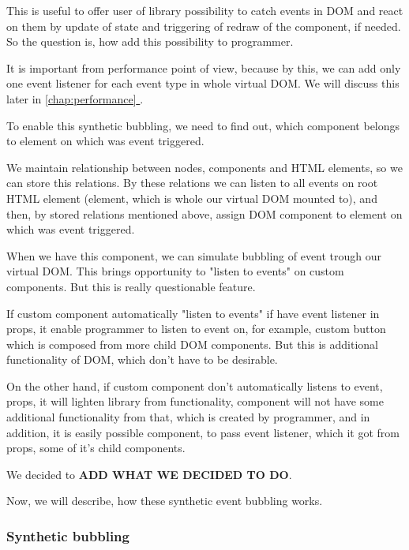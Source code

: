 \documentclass[oneside, 12pt]{book}
\newcommand*{\fullref}[1]{\hyperref[{#1}]{\autoref*{#1} \nameref*{#1}}}
\begin{document}
    This is useful to offer user of library possibility to catch events in DOM and react on them by update of state 
    and triggering of redraw of the component, if needed. So the question is, how add this possibility to programmer.

    It is important from performance point of view, because by this, we can add only one event listener for each event type in whole virtual DOM.
    We will discuss this later in \fullref{chap:performance}.

    To enable this synthetic bubbling, we need to find out, which component belongs to element on which was event triggered.

    We maintain relationship between nodes, components and HTML elements, so we can store this relations.
    By these relations we can listen to all events on root HTML element 
    (element, which is whole our virtual DOM mounted to), 
    and then, by stored relations mentioned above, assign DOM component to element on which was event triggered.

    When we have this component, we can simulate bubbling of event trough our virtual DOM. 
    This brings opportunity to "listen to events" on custom components. 
    But this is really questionable feature.

    If custom component automatically "listen to events" if have event listener in props, 
    it enable programmer to listen to event on, for example, custom button which is composed from more child DOM components.
    But this is additional functionality of DOM, which don't have to be desirable. 

    On the other hand, if custom component don't automatically listens to event, props, it will lighten library from functionality, 
    component will not have some additional functionality from that, which is created by programmer, 
    and in addition, it is easily possible component, to pass event listener, which it got from props, some of it's child components.
    
    We decided to \textbf{ADD WHAT WE DECIDED TO DO}.

    Now, we will describe, how these synthetic event bubbling works.

    \subsubsection{Synthetic bubbling}\label{subsec:our-architecture-events-bubbling}
\end{document}
